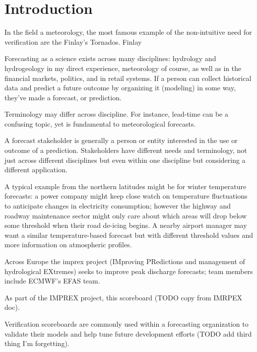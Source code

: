 \documentclass[logos,parttoc,morelanguage=french,morelanguage=italian]{orsay-memoire}
\begin{document}
\pagestyle{fancy}

\section{Introduction}

\par In the field a meteorology, the most famous example of the non-intuitive need for verification are the Finlay's Tornados.  Finlay 

\par Forecasting as a science exists across many disciplines: hydrology and hydrogeology in my direct experience, meteorology of course, as well as in the financial markets, politics, and in retail systems. If a person can collect historical data and predict a future outcome by organizing it (modeling) in some way, they've made a forecast, or prediction.

Terminology may differ across discipline. For instance, \gls{lead-time} can be a confusing topic, yet is fundamental to meteorological forecasts. 

\par A forecast stakeholder is generally a person or entity interested in the use or outcome of a prediction. Stakeholders have different needs and terminology, not just across different disciplines but even within one discipline but considering a different application.

\par A typical example from the northern latitudes might be for winter temperature forecasts: a power company might keep close watch on temperature fluctuations to anticipate changes in electricity consumption; however the highway and roadway maintenance sector might only care about which areas will drop below some threshold when their road de-icing begins. A nearby airport manager may want a similar temperature-based forecast but with different threshold values and more information on atmospheric profiles.

Across Europe the \gls{imprex} project (IMproving PRedictions and management of hydrological EXtremes) seeks to improve peak discharge forecasts; team members include ECMWF's EFAS team. 

As part of the IMPREX project, this scoreboard (TODO copy from IMRPEX doc).

Verification scoreboards are commonly used within a forecasting organization to validate their models and help tune future development efforts (TODO add third thing I'm forgetting). 
\end{document}
